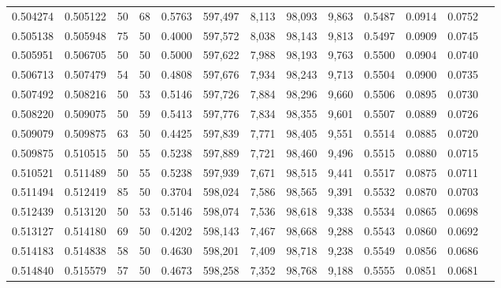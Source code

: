 \begin{tabular}{rrrrrrrrrrrrr}
0.504274 & 0.505122 &    50 &  68 &                                     0.5763 & 597,497 &   8,113 &  98,093 &   9,863 & 0.5487 & 0.0914 & 0.0752 \\
0.505138 & 0.505948 &    75 &  50 &                                     0.4000 & 597,572 &   8,038 &  98,143 &   9,813 & 0.5497 & 0.0909 & 0.0745 \\
0.505951 & 0.506705 &    50 &  50 &                                     0.5000 & 597,622 &   7,988 &  98,193 &   9,763 & 0.5500 & 0.0904 & 0.0740 \\
0.506713 & 0.507479 &    54 &  50 &                                     0.4808 & 597,676 &   7,934 &  98,243 &   9,713 & 0.5504 & 0.0900 & 0.0735 \\
0.507492 & 0.508216 &    50 &  53 &                                     0.5146 & 597,726 &   7,884 &  98,296 &   9,660 & 0.5506 & 0.0895 & 0.0730 \\
0.508220 & 0.509075 &    50 &  59 &                                     0.5413 & 597,776 &   7,834 &  98,355 &   9,601 & 0.5507 & 0.0889 & 0.0726 \\
0.509079 & 0.509875 &    63 &  50 &                                     0.4425 & 597,839 &   7,771 &  98,405 &   9,551 & 0.5514 & 0.0885 & 0.0720 \\
0.509875 & 0.510515 &    50 &  55 &                                     0.5238 & 597,889 &   7,721 &  98,460 &   9,496 & 0.5515 & 0.0880 & 0.0715 \\
0.510521 & 0.511489 &    50 &  55 &                                     0.5238 & 597,939 &   7,671 &  98,515 &   9,441 & 0.5517 & 0.0875 & 0.0711 \\
0.511494 & 0.512419 &    85 &  50 &                                     0.3704 & 598,024 &   7,586 &  98,565 &   9,391 & 0.5532 & 0.0870 & 0.0703 \\
0.512439 & 0.513120 &    50 &  53 &                                     0.5146 & 598,074 &   7,536 &  98,618 &   9,338 & 0.5534 & 0.0865 & 0.0698 \\
0.513127 & 0.514180 &    69 &  50 &                                     0.4202 & 598,143 &   7,467 &  98,668 &   9,288 & 0.5543 & 0.0860 & 0.0692 \\
0.514183 & 0.514838 &    58 &  50 &                                     0.4630 & 598,201 &   7,409 &  98,718 &   9,238 & 0.5549 & 0.0856 & 0.0686 \\
0.514840 & 0.515579 &    57 &  50 &                                     0.4673 & 598,258 &   7,352 &  98,768 &   9,188 & 0.5555 & 0.0851 & 0.0681 \\

\end{tabular}
